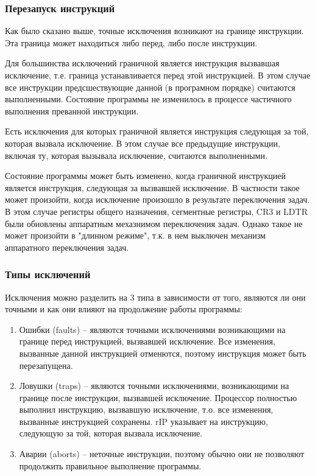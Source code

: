 \subsubsection*{Перезапуск инструкций}
Как было сказано выше, точные исключения возникают на границе инструкции. Эта
граница может находиться либо перед, либо после инструкции.

Для большинства исключений граничной является инструкция вызвавшая исключение,
т.е. граница устанавливается перед этой инструкцией. В этом случае все
инструкции предсшествующие данной (в програмном порядке) считаются
выполненными. Состояние программы не изменилось в процессе частичного
выполнения преванной инструкции.

Есть исключения для которых граничной является инструкция следующая за той,
которая вызвала исключение. В этом случае все предыдущие инструкции, включая
ту, которая вызывала исключение, считаются выполненными.

Состояние программы может быть изменено, когда граничной инструкцией является
инструкция, следующая за вызвавшей исключение. В частности такое может
произойти, когда исключение произошло в результате переключения задач. В этом
случае регистры общего назначения, сегментные регистры, CR3 и LDTR были обновлены
аппаратным мехазнимом переключения задач. Однако такое не может произойти в
"длинном режиме", т.к. в нем выключен механизм аппаратного переключения задач.

\subsubsection*{Типы исключений}
Исключения можно разделить на 3 типа в зависимости от того, являются ли они
точными и как они влияют на продолжение работы программы:
\begin{enumerate}
\item Ошибки (faults) -- являются точными исключениями возникающими на границе перед
инструкцией, вызвавшей исключение. Все изменения, вызванные данной инструкцией
отменются, поэтому инструкция может быть перезапущена.
\item Ловушки (traps) -- являются точными исключениями, возникающими на границе после
инструкции, вызвавшей исключение. Процессор полностью выполнил инструкцию,
вызвавшую исключение, т.о. все изменения, вызванные инструкцией сохранены.
rIP указывает на инструкцию, следующую за той, которая вызвала исключение.
\item Аварии (aborts) -- неточные инструкции, поэтому обычно они не позволяют
продолжить правильное выполнение программы.
\end{enumerate}


